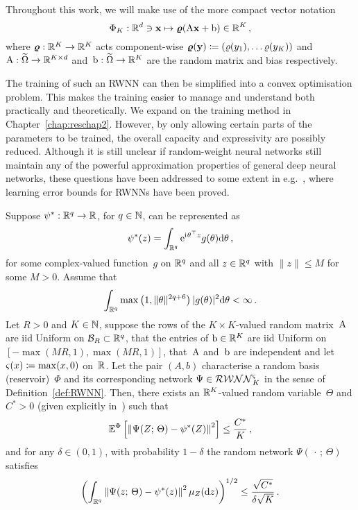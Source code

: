 \begin{remark}
Throughout this work, we will make use of the more compact vector notation
$$
\Phi_K: \mathbb{R}^d \ni \boldsymbol{\mathrm{x}}\mapsto \boldsymbol\varrho(\mathrm{A} \mathbf{x}+\mathrm{b}) \in \mathbb{R}^{K}\,,
$$
where $\boldsymbol\varrho:\mathbb{R}^K\rightarrow\mathbb{R}^K$ acts component-wise $\boldsymbol\varrho(\boldsymbol{\mathrm{y}})\coloneqq(\varrho(y_1), \dots \varrho(y_K))$ and~${\mathrm{A}: \widetilde{\Omega} \rightarrow \mathbb{R}^{K\times d}}$ and~${\mathrm{b}: \widetilde{\Omega} \rightarrow \mathbb{R}^K}$ are the random matrix and bias respectively.
\end{remark}

The training of such an RWNN can then be simplified into a convex optimisation problem. This makes the training easier to manage and understand both practically and theoretically. We expand on the training method in Chapter~\ref{chap:reschap2}. However, by only allowing certain parts of the parameters to be trained, the overall capacity and expressivity are possibly reduced. Although it is still unclear if random-weight neural networks still maintain any of the powerful approximation properties of general deep neural networks, these questions have been addressed to some extent in e.g.~\cite{Gonon2020ApproximationSystems, Mei2022GeneralizationConcentration}, where learning error bounds for RWNNs have been proved.

\begin{proposition}\label{prop:UATRWNN}
Suppose $\psi^{*}: \mathbb{R}^{q} \rightarrow \mathbb{R}$, for $q\in\mathbb{N}$, can be represented as
$$
\psi^{*}(z)=\int_{\mathbb{R}^{q}} \mathrm{e}^{{\mathrm{i}\mkern1mu}\theta^\top z} g(\theta) \mathrm{d} \theta\,,
$$
for some complex-valued function~$g$ on $\mathbb{R}^{q}$ and all $z \in \mathbb{R}^{q}$ with $\|z\| \leq M$ for some $M>0$. Assume that
$$
\int_{\mathbb{R}^{q}} \max \left(1,\|\theta \|^{2 q+6}\right)|g(\theta)|^{2} \mathrm{d} \theta <\infty\,.
$$
Let $R>0$ and $K\in\mathbb{N}$, suppose the rows of the $K\times K$-valued random matrix~$\mathrm{A}$ are iid Uniform on $\mathcal{B}_{R} \subset \mathbb{R}^{q}$, that the entries of $\mathrm{b}\in\mathbb{R}^{K}$ are iid Uniform on~$[-\max (M R, 1), \max (M R, 1)]$, 
that~$\mathrm{A}$ and~$\mathrm{b}$ are independent and let~${\varsigma(x)\coloneqq\max (x, 0)}$ on~$\mathbb{R}$. 
Let the pair $(A,b)$ characterise a random basis (reservoir)~$\Phi$ and its corresponding network $\Psi\in\mathcal{RWNN}^{\varsigma}_K$ in the sense of Definition~\ref{def:RWNN}. 
Then, there exists an $\mathbb{R}^K$-valued random variable~$\Theta$ and $C^{*}>0$ 
(given explicitly in~\cite[Equation~(33)]{Gonon2020ApproximationSystems}) such that
$$
\mathbb{E}^\Phi\left[\left\|\Psi(Z;\, \Theta)-\psi^{*}(Z)\right\|^{2}\right] \leq \frac{C^{*}}{K}\,,
$$
and for any $\delta \in(0,1)$, with probability $1-\delta$ the random network $\Psi(\,\cdot\,;\,\Theta)$ satisfies
$$
\left(\int_{\mathbb{R}^{q}}\left\|\Psi(z;\, \Theta)-\psi^{*}(z)\right\|^{2} \mu_{Z}(\mathrm{d} z)\right)^{1 / 2} \leq \frac{\sqrt{C^{*}}}{\delta \sqrt{K}}\,.
$$
\end{proposition}

